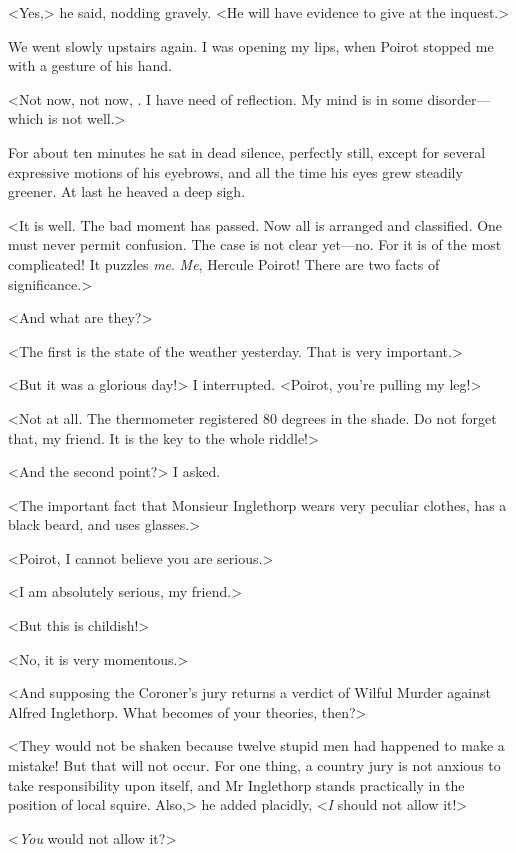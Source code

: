  <Yes,> he said, nodding gravely. <He will have evidence to give at the inquest.> 

 We went slowly upstairs again. I was opening my lips, when Poirot stopped me with a gesture of his hand. 

 <Not now, not now, . I have need of reflection. My mind is in some disorder—which is not well.> 

 For about ten minutes he sat in dead silence, perfectly still, except for several expressive motions of his eyebrows, and all the time his eyes grew steadily greener. At last he heaved a deep sigh. 

 <It is well. The bad moment has passed. Now all is arranged and classified. One must never permit confusion. The case is not clear yet—no. For it is of the most complicated! It puzzles \emph{me}. \emph{Me}, Hercule Poirot! There are two facts of significance.> 

 <And what are they?> 

 <The first is the state of the weather yesterday. That is very important.> 

 <But it was a glorious day!> I interrupted. <Poirot, you're pulling my leg!> 

 <Not at all. The thermometer registered 80 degrees in the shade. Do not forget that, my friend. It is the key to the whole riddle!> 

 <And the second point?> I asked. 

 <The important fact that Monsieur Inglethorp wears very peculiar clothes, has a black beard, and uses glasses.> 

 <Poirot, I cannot believe you are serious.> 

 <I am absolutely serious, my friend.> 

 <But this is childish!> 

 <No, it is very momentous.> 

 <And supposing the Coroner's jury returns a verdict of Wilful Murder against Alfred Inglethorp. What becomes of your theories, then?> 

 <They would not be shaken because twelve stupid men had happened to make a mistake! But that will not occur. For one thing, a country jury is not anxious to take responsibility upon itself, and Mr Inglethorp stands practically in the position of local squire. Also,> he added placidly, <\emph{I} should not allow it!> 

 <\emph{You} would not allow it?> 

